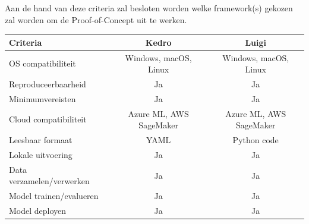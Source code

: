 Aan de hand van deze criteria zal besloten worden welke framework(s) gekozen zal worden om de Proof-of-Concept uit te werken.
\begin{table}[]
    \begin{tabular}{|l|c|c|}
        \hline
        Criteria & Kedro & Luigi \\
        \hline
        OS compatibiliteit & Windows, macOS, Linux & Windows, macOS, Linux \\
        Reproduceerbaarheid & Ja & Ja \\
        Minimumvereisten & Ja & Ja \\
        Cloud compatibiliteit & Azure ML, AWS SageMaker & Azure ML, AWS SageMaker \\
        Leesbaar formaat & YAML & Python code \\
        Lokale uitvoering & Ja & Ja \\
        Data verzamelen/verwerken & Ja & Ja \\
        Model trainen/evalueren & Ja & Ja \\
        Model deployen & Ja & Ja \\
        \hline
\end{tabular}
\end{table}

